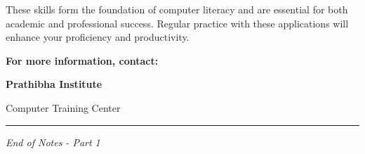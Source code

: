 \documentclass[12pt,a4paper]{article}
\begin{document}
These skills form the foundation of computer literacy and are essential for both academic and professional success. Regular practice with these applications will enhance your proficiency and productivity.

\vspace{1cm}

\textbf{For more information, contact:}

\textbf{Prathibha Institute}

Computer Training Center

\vspace{2cm}

\hrule
\vspace{0.3cm}
\textit{End of Notes - Part 1}
\end{document}
